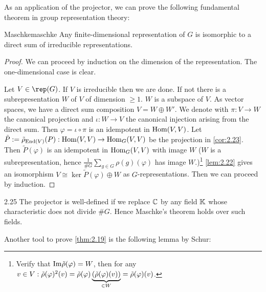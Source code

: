 \documentclass[twoside = false,	%
		headsepline,		%
		parskip = true,
		]{scrbook}						%
\begin{document}
    As an application of the projector, we can prove the following fundamental theorem in group representation theory:

    \begin{theorem}{Maschke}{maschke}
        Any finite-dimensional representation of $G$ is isomorphic to a direct sum of irreducible representations.
    \end{theorem}
    \begin{proof}
        We can proceed by induction on the dimension of the representation. The one-dimensional case is clear.

        Let $V\in\rep(G)$. If $V$ is irreducible then we are done. If not there is a subrepresentation $W$ of $V$ of dimension $\geq 1$. $W$ is a subspace of $V$. As vector spaces, we have a direct sum composition $V=W\oplus W'$. We denote with $\pi: V \to W$ the canonical projection and $\iota: W\to V$ the canonical injection arising from the direct sum. Then $\varphi=\iota\circ\pi$ is an idempotent in $\mathrm{Hom}(V,V)$. Let $\tilde P:=\tilde \rho_{\mathrm{End}(V)}(P):\mathrm{Hom}(V,V)\to \mathrm{Hom}_G(V,V)$ be the projection in \ref{cor:2.23}. Then $\tilde P(\varphi)$ is an idempotent in $\mathrm{Hom}_G(V,V)$ with image $W$ ($W$ is a subrepresentation, hence $\frac1{\# G}\sum_{g\in G}\rho(g)(\varphi)$ has image $W$.)\footnote{Verify that $\mathrm{Im} \tilde{\rho} (\varphi)=W$, then for any $v\in V: \tilde\rho(\varphi)^2(v)=\tilde\rho(\varphi)\underbrace{\left( \tilde\rho(\varphi)(v)\right)}_{\in W} = \tilde\rho(\varphi)(v)$.}
        \ref{lem:2.22} gives an isomorphism $V\cong \ker\tilde P(\varphi)\oplus W$ as $G$-representations. Then we can proceed by induction.
    \end{proof}

    \begin{remark}{}{2.25}
        The projector is well-defined if we replace $\mathbb C$ by any field $\mathbb K$ whose characteristic does not divide $\#G$. Hence Maschke's theorem holds over such fields.
    \end{remark}

    Another tool to prove \ref{thm:2.19} is the following lemma by Schur:
\end{document}
